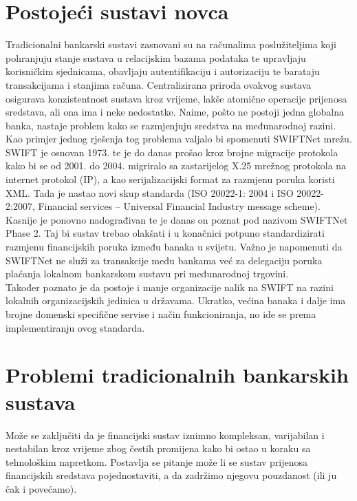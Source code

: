 \documentclass[utf8, zavrsni]{fer}
\begin{document}
\section{Postojeći sustavi novca}
Tradicionalni bankarski sustavi zasnovani su na računalima poslužiteljima koji pohranjuju stanje sustava u relacijskim bazama podataka te upravljaju korisničkim sjednicama, obavljaju autentifikaciju i autorizaciju te barataju transakcijama i stanjima računa. Centralizirana priroda ovakvog sustava osigurava konzistentnost sustava kroz vrijeme, lakše atomične operacije prijenosa sredstava, ali ona ima i neke nedostatke. 
	Naime, pošto ne postoji jedna globalna banka, nastaje problem kako se razmjenjuju sredstva na međunarodnoj razini. Kao primjer jednog rješenja tog problema valjalo bi spomenuti SWIFTNet mrežu. SWIFT je osnovan 1973. te je do danas prošao kroz brojne migracije protokola kako bi se od 2001. do 2004. migriralo sa zastarijelog X.25 mrežnog protokola na internet protokol (IP), a kao serijalizacijski format za razmjenu poruka koristi XML. Tada je nastao novi skup standarda (ISO 20022-1: 2004 i ISO 20022-2:2007, Financial services – Universal Financial Industry message scheme). Kasnije je ponovno nadograđivan te je danas on poznat pod nazivom SWIFTNet Phase 2. Taj bi sustav trebao olakšati i u konačnici potpuno standardizirati razmjenu financijskih poruka između banaka u svijetu. Važno je napomenuti da SWIFTNet ne služi za transakcije među bankama već za delegaciju poruka plaćanja lokalnom bankarskom sustavu pri međunarodnoj trgovini. \\

	Također poznato je da postoje i manje organizacije nalik na SWIFT na razini lokalnih organizacijskih jedinica u državama. Ukratko, većina banaka i dalje ima brojne domenski specifične servise i način funkcioniranja, no ide se prema implementiranju ovog standarda.\\
\section{Problemi tradicionalnih bankarskih sustava}
	
	Može se zaključiti da je financijski sustav iznimno kompleksan, varijabilan i nestabilan kroz vrijeme zbog čestih promijena kako bi ostao u koraku sa tehnološkim napretkom. Postavlja se pitanje može li se sustav prijenosa financijskih sredstava pojednostaviti, a da zadržimo njegovu pouzdanost (ili ju čak i povećamo). \\
\end{document}
